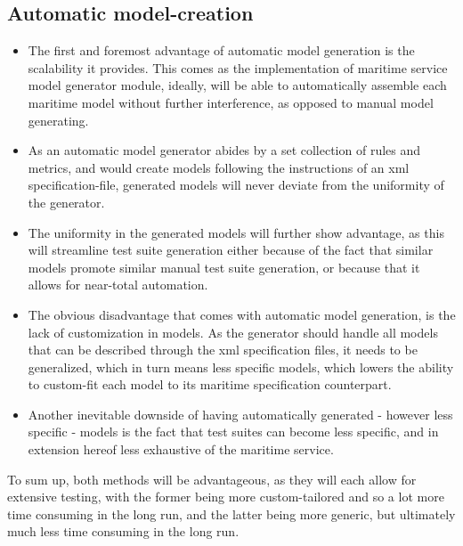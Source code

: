 \subsection{Automatic model-creation}
\begin{itemize}
  \item The first and foremost advantage of automatic model generation is the scalability it provides. This comes as the implementation of  maritime service model generator module, ideally, will be able to automatically assemble each maritime model without further interference, as opposed to manual model generating.
  \item As an automatic model generator abides by a set collection of rules and metrics, and would create models following the instructions of an xml specification-file, generated models will never deviate from the uniformity of the generator.
  \item The uniformity in the generated models will further show advantage, as this will streamline test suite generation either because of the fact that similar models promote similar manual test suite generation, or because that it allows for near-total automation.
\end{itemize}
\begin{itemize}
  \item The obvious disadvantage that comes with automatic model generation, is the lack of customization in models. As the generator should handle all models that can be described through the xml specification files, it needs to be generalized, which in turn means less specific models, which lowers the ability to custom-fit each model to its maritime specification counterpart.
  \item Another inevitable downside of having automatically generated - however less specific - models is the fact that test suites can become less specific, and in extension hereof less exhaustive of the maritime service.
\end{itemize}
\indent
To sum up, both methods will be advantageous, as they will each allow for extensive testing, with the former being more custom-tailored and so a lot more time consuming in the long run, and the latter being more generic, but ultimately much less time consuming in the long run.